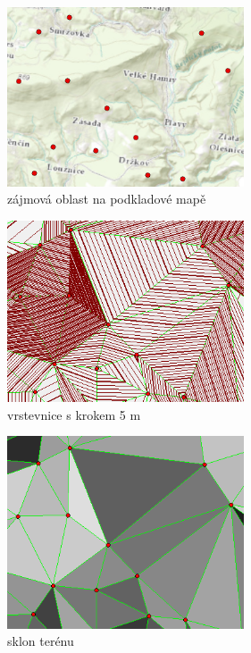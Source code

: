 \begin{figure}[H]

\begin{subfigure}{.475\linewidth}
\centering
  \includegraphics[width=7cm]{images/case3.png}
  \caption{zájmová oblast na podkladové mapě}
  \label{MLEDdet}
\end{subfigure}\hfill %
\begin{subfigure}{.475\linewidth}
\centering
  \includegraphics[width=7cm]{images/case3m5.png}
  \caption{vrstevnice s krokem 5 m}
  \label{energydetPSK}
\end{subfigure}\hfill
\medskip
\medskip
\begin{subfigure}{.475\linewidth}
\centering
  \includegraphics[width=7cm]{images/case3s.png}
  \caption{sklon terénu}
  \label{MLEDdet}
\end{subfigure}\hfill %
\begin{subfigure}{.475\linewidth}

\end{subfigure}
\end{figure}
